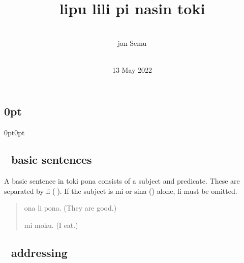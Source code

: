 \documentclass[statementpaper,oneside,article,14pt]{memoir}
\newcommand{\BackgroundPic}[1]{%
\put(0,0){%
\parbox[b][\paperheight]{\paperwidth}{%
\vfill
\centering
{\transparent{0.4} \texttt{[image: \#1]}}%
\vfill
}}}
\begin{document}
\titlespacing\subsection{0pt}{0pt}{0pt}

\newcommand{\nimi}[3]{\item[{\sitpon#1} #2] #3}


\title{{} \\ lipu lili pi nasin toki}
\author{{\sitpon󱤑󱦐󱥚󱤉󱤻󱥱󱦑} \\ jan Semu}
\date{{\sitpon󱥤󱥡󱦓󱥫󱤣󱦓󱥜󱤻󱦓󱥜󱥣󱥇} \\ 13 May 2022}

\begingroup
\let\cleardoublepage\clearpage


\begin{titlingpage}
\maketitle


\end{titlingpage}

\endgroup

\pagestyle{empty}



\subsection{{\sitpon󱤧} basic sentences}

\noindent A basic sentence in toki pona consists of a subject and predicate. These are separated by li ({\sitpon󱤧}).
If the subject is mi or sina ({}) alone, li must be omitted.

\begin{quote}
  ona li pona. (They are good.)

  mi moku. (I eat.)
\end{quote}

\subsection{{\sitpon󱥄} addressing}
\end{document}
